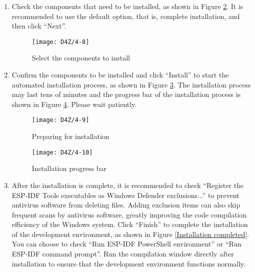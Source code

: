 \documentclass[a4paper,12pt]{book}
\begin{document}
\begin{enumerate}[label=(\arabic*)]
    \begin{figure}[h!]
        \centering
        \texttt{[image: D4Z/4-7]}
        \caption{Select the ESP-IDF installation directory}
        \label{Select the ESP-IDF installation directory}
    \end{figure}

    \item Check the components that need to be installed, as shown in Figure \ref{Select the components to install}. It is recommended to use the default option, that is, complete installation, and then click “Next”.

    \begin{figure}[h!]
        \centering
        \texttt{[image: D4Z/4-8]}
        \caption{Select the components to install}
        \label{Select the components to install}
    \end{figure}

    \item Confirm the components to be installed and click “Install” to start the automated installation process, as shown in Figure \ref{Preparing for installation}. The installation process may last tens of minutes and the progress bar of the installation process is shown in Figure \ref{Installation progress bar}. Please wait patiently.

    \begin{figure}[h!]
        \centering
        \texttt{[image: D4Z/4-9]}
        \caption{Preparing for installation}
        \label{Preparing for installation}
    \end{figure}

    \begin{figure}[h!]
        \centering
        \texttt{[image: D4Z/4-10]}
        \caption{Installation progress bar}
        \label{Installation progress bar}
    \end{figure}

    \item After the installation is complete, it is recommended to check “Register the ESP-IDF Tools executables as Windows Defender exclusions...” to prevent antivirus software from deleting files. Adding exclusion items can also skip frequent scans by antivirus software, greatly improving the code compilation efficiency of the Windows system. Click “Finish” to complete the installation of the development environment, as shown in Figure \ref{Installation completed}. You can choose to check “Run ESP-IDF PowerShell environment” or “Run ESP-IDF command prompt”. Run the compilation window directly after installation to ensure that the development environment functions normally.


\end{enumerate}
\end{document}

